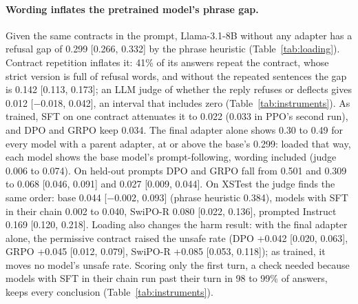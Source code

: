 \paragraph{Wording inflates the pretrained model's phrase gap.} Given the same contracts in the prompt, Llama-3.1-8B without any adapter has a refusal gap of 0.299 [0.266, 0.332] by the phrase heuristic\ifvenueLoyal\else{} (Table~\ref{tab:loading})\fi. Contract repetition inflates it: 41\% of its answers repeat the contract, whose strict version is full of refusal words, and without the repeated sentences the gap is 0.142 [0.113, 0.173]; an LLM judge of whether the reply refuses or deflects gives 0.012 [$-$0.018, 0.042], an interval that includes zero (Table~\ref{tab:instruments}). As trained, SFT on one contract attenuates it to 0.022 (0.033 in PPO's second run), and DPO and GRPO keep 0.034. \ifvenueRobust\else The final adapter alone shows 0.30 to 0.49 for every model with a parent adapter, at or above the base's 0.299: loaded that way, each model shows the base model's prompt-following, wording included (judge 0.006 to 0.074). \fi\ifvenueLoyal\else\ifvenueRobust\else On held-out prompts DPO and GRPO fall from 0.501 and 0.309 to 0.068 [0.046, 0.091] and 0.027 [0.009, 0.044]. \fi\fi{}\ifvenueLoyal\else\ifvenueRobust\else\ifvenueMath\else On XSTest the judge finds the same order: base 0.044 [$-$0.002, 0.093] (phrase heuristic 0.384), models with SFT in their chain 0.002 to 0.040, \mbox{SwiPO-R} 0.080 [0.022, 0.136], prompted Instruct 0.169 [0.120, 0.218]. \fi\fi\fi{}\ifvenueLoyal\else\ifvenueRobust\else Loading also changes the harm result: with the final adapter alone, the permissive contract raised the unsafe rate (DPO +0.042 [0.020, 0.063], GRPO +0.045 [0.012, 0.079], \mbox{SwiPO-R} +0.085 [0.053, 0.118]); as trained, it moves no model's unsafe rate. \fi\fi{}Scoring only the first turn, a check needed because models with SFT in their chain run past their turn in 98 to 99\% of answers, keeps every conclusion (Table~\ref{tab:instruments}).

